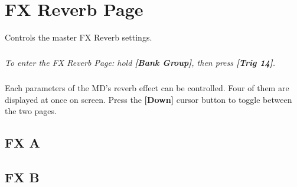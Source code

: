 \chapter{FX Reverb Page}
Controls the master FX Reverb settings.\\
\vspace{-16pt}
\vspace{-32pt}
\paragraph{}\textit{To enter the FX Reverb Page: hold \textbf{[Bank Group]}, then press \textbf{[Trig 14]}.}
\vspace{-16pt}
\paragraph{}
Each parameters of the MD's reverb effect can be controlled. Four of them are displayed at once on screen. Press the \textbf{[Down]} cursor button to toggle between the two pages.

\vspace{-4pt}
\section{FX A}
\vspace{-16pt}
\vspace{-25pt}
\vspace{-10pt}
\section{FX B}
\vspace{-16pt}
\vspace{-25pt}
\begin{figure}[h!]
\end{figure}
